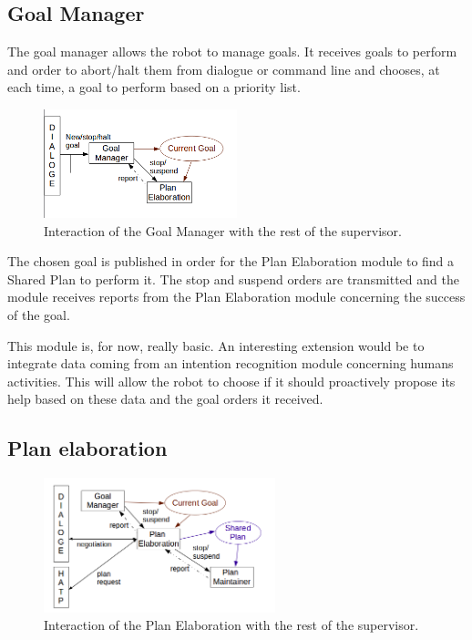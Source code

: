\documentclass[english,a4paper,11pt,twoside]{StyleThese}
\begin{document}
\subsection{Goal Manager}

The goal manager allows the robot to manage goals. It receives goals to perform and order to abort/halt them from dialogue or command line and chooses, at each time, a goal to perform based on a priority list. 

\begin{figure}[!h]
	\centering
    \includegraphics[width=0.5\textwidth]{figs/Chapter2/GoalManager.png}
    \caption{Interaction of the Goal Manager with the rest of the supervisor.}
    \label{fig:goalManager}
\end{figure}

The chosen goal is published in order for the Plan Elaboration module to find a Shared Plan to perform it. The stop and suspend orders are transmitted and the module receives reports from the Plan Elaboration module concerning the success of the goal.

This module is, for now, really basic. An interesting extension would be to integrate data coming from an intention recognition module concerning humans activities. This will allow the robot to choose if it should proactively propose its help based on these data and the goal orders it received. 

\subsection{Plan elaboration}

\begin{figure}[!h]
	\centering
    \includegraphics[width=0.6\textwidth]{figs/Chapter2/PlanElaboration.png}
    \caption{Interaction of the Plan Elaboration with the rest of the supervisor.}
    \label{fig:planElaboration}
\end{figure}
\end{document}

